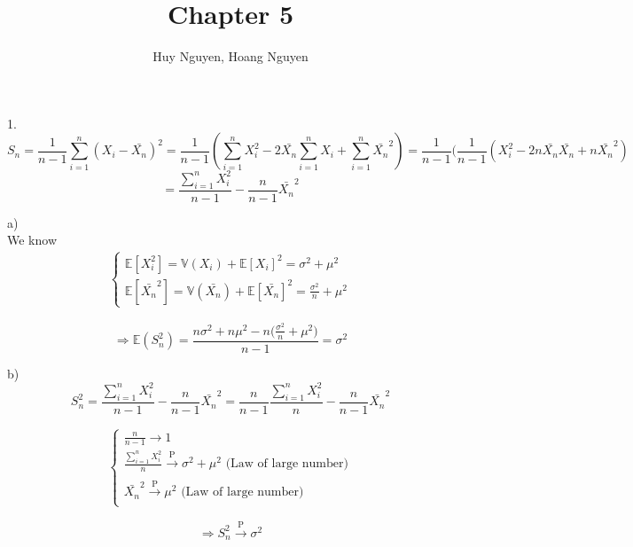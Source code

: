 \documentclass[10pt]{article}
\newenvironment{problem}[2][Problem]{\begin{trivlist}
\item[\hskip \labelsep {\bfseries #1}\hskip \labelsep {\bfseries #2.}]}{\end{trivlist}}
\begin{document}
\title{Chapter 5}
\author{Huy Nguyen, Hoang Nguyen}
\maketitle
    
\begin{problem}{1}

\item 1.
\[S_n=\frac{1}{n-1}\sum_{i=1}^{n}(X_i-\bar{X_n})^2=\frac{1}{n-1}(\sum_{i=1}^{n} X_{i}^2- 2\bar{X_n}\sum_{i=1}^{n}X_i+ \sum_{i=1}^{n}\bar{X_n}^2)=\frac{1}{n-1}(\frac{1}{n-1}(X_{i}^2- 2n\bar{X_n}\bar{X_n}+n\bar{X_n}^2)\]
\[=\frac{\sum_{i=1}^{n}X_i^2}{n-1}- \frac{n}{n-1}\bar{X_n}^2\]

a) \\

We know
\begin{align}
    \begin{cases}
        \mathbb{E}[X_i^2]= \mathbb{V}(X_i) + \mathbb{E}[X_i]^2= \sigma^2 + \mu^2 \\
        \mathbb{E}[\bar{X_n}^2]= \mathbb{V}(\bar{X_n}) + \mathbb{E}[\bar{X_n}]^2= \frac{\sigma^2}{n}  + \mu^2
    \end{cases}
\end{align}

\[\Rightarrow \mathbb{E}(S_n^2)=\frac{n\sigma^2 + n\mu^2-n\big(\frac{\sigma^2}{n}  + \mu^2 \big)}{n-1}= \sigma^2\]

b) \\

\[S_n^2=\frac{\sum_{i=1}^{n}X_i^2}{n-1}- \frac{n}{n-1}\bar{X_n}^2=\frac{n}{n-1} \frac{\sum_{i=1}^{n}X_i^2}{n}- \frac{n}{n-1}\bar{X_n}^2\]

\begin{align}
    \begin{cases}
        \frac{n}{n-1} \rightarrow 1 \\
        \frac{\sum_{i=1}^{n}X_i^2}{n} \xrightarrow[]{\text{P}} \sigma^2+\mu^2 \text{ (Law of large number)}\\
        \bar{X_n}^2 \xrightarrow[]{\text{P}} \mu^2 \text{ (Law of large number)}
    \end{cases}
\end{align}

\[\Rightarrow S_n^2 \xrightarrow[]{\text{P}} \sigma^2\]




\end{problem}
\end{document}
